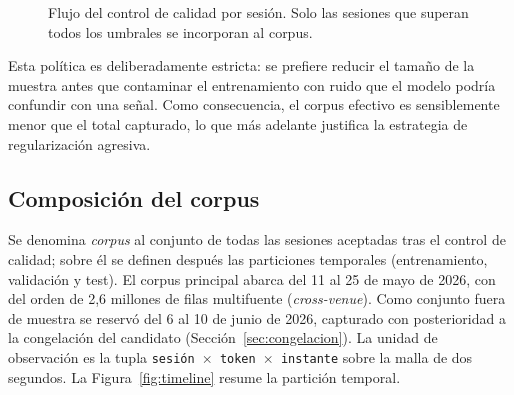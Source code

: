 \begin{figure}[h]
\centering
{}
\caption{Flujo del control de calidad por sesión. Solo las sesiones que superan todos los
umbrales se incorporan al corpus.}
\label{fig:qa}
\end{figure}

Esta política es deliberadamente estricta: se prefiere reducir el tamaño de la muestra antes
que contaminar el entrenamiento con ruido que el modelo podría confundir con una señal. Como consecuencia, el corpus
efectivo es sensiblemente menor que el total capturado, lo que más adelante justifica la
estrategia de regularización agresiva.

\subsection{Composición del corpus}

Se denomina \emph{corpus} al conjunto de todas las sesiones aceptadas tras el control de
calidad; sobre él se definen después las particiones temporales (entrenamiento, validación y
test). El corpus principal abarca del 11 al 25 de mayo de 2026, con del orden de 2,6 millones
de filas multifuente (\emph{cross-venue}). Como conjunto fuera
de muestra se reservó del 6 al 10 de junio de 2026, capturado con posterioridad a la
congelación del candidato (Sección~\ref{sec:congelacion}). La unidad de observación es la
tupla \texttt{sesión $\times$ token $\times$ instante} sobre la malla de dos segundos. La
Figura~\ref{fig:timeline} resume la partición temporal.

